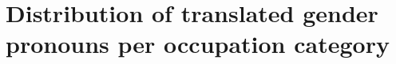 \documentclass[fleqn,10pt]{article}
\begin{document}
%

\section{Distribution of translated gender pronouns per occupation category}
\end{document}

